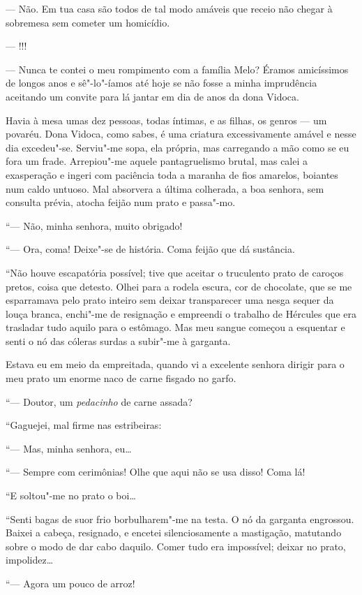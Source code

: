 --- Não. Em tua casa são todos de tal modo amáveis que receio não chegar
à sobremesa sem cometer um homicídio.

--- !!!

--- Nunca te contei o meu rompimento com a família Melo? Éramos
amicíssimos de longos anos e sê"-lo"-íamos até hoje se não fosse a minha
imprudência aceitando um convite para lá jantar em dia de anos da dona
Vidoca.

Havia à mesa umas dez pessoas, todas íntimas, e as filhas, os genros ---
um povaréu. Dona Vidoca, como sabes, é uma criatura excessivamente
amável e nesse dia excedeu"-se. Serviu"-me sopa, ela própria, mas
carregando a mão como se eu fora um frade. Arrepiou"-me aquele
pantagruelismo brutal, mas calei a exasperação e ingeri com paciência
toda a maranha de fios amarelos, boiantes num caldo untuoso. Mal
absorvera a última colherada, a boa senhora, sem consulta prévia, atocha
feijão num prato e passa"-mo.

``--- Não, minha senhora, muito obrigado!

``--- Ora, coma! Deixe"-se de história. Coma feijão que dá sustância.

``Não houve escapatória possível; tive que aceitar o truculento prato de
caroços pretos, coisa que detesto. Olhei para a rodela escura, cor de
chocolate, que se me esparramava pelo prato inteiro sem deixar
transparecer uma nesga sequer da louça branca, enchi"-me de resignação e
empreendi o trabalho de Hércules que era trasladar tudo aquilo para o
estômago. Mas meu sangue começou a esquentar e senti o nó das cóleras
surdas a subir"-me à garganta.

Estava eu em meio da empreitada, quando vi a excelente senhora dirigir
para o meu prato um enorme naco de carne fisgado no garfo.

``--- Doutor, um \emph{pedacinho} de carne assada?

``Gaguejei, mal firme nas estribeiras:

``--- Mas, minha senhora, eu\ldots{}

``--- Sempre com cerimônias! Olhe que aqui não se usa disso! Coma lá!

``E soltou"-me no prato o boi\ldots{}

``Senti bagas de suor frio borbulharem"-me na testa. O nó da garganta
engrossou. Baixei a cabeça, resignado, e encetei silenciosamente a
mastigação, matutando sobre o modo de dar cabo daquilo. Comer tudo era
impossível; deixar no prato, impolidez\ldots{}

``--- Agora um pouco de arroz!

